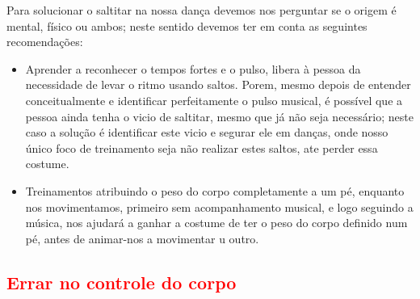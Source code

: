 \begin{SolutionT}
Para solucionar o saltitar na nossa dança devemos nos perguntar se o origem é mental, físico ou ambos;
neste sentido devemos ter em conta as seguintes recomendações:
\begin{itemize}
\item  Aprender a reconhecer o tempos fortes e o pulso, 
libera à pessoa da necessidade de levar o ritmo usando saltos.
Porem, mesmo depois de entender conceitualmente e identificar perfeitamente o pulso musical,
é possível que a pessoa ainda tenha o vicio de saltitar, mesmo que já não seja necessário;
neste caso a solução é identificar este vicio e segurar ele em danças, 
onde nosso único foco de treinamento seja não realizar estes saltos, ate perder essa costume.
\item  Treinamentos atribuindo o peso do corpo completamente a um pé, 
enquanto nos movimentamos, primeiro sem acompanhamento musical,
e logo seguindo a música, 
nos ajudará a ganhar a costume de ter o peso do corpo definido num pé,
antes de animar-nos a movimentar u outro. 
\end{itemize}
\end{SolutionT}




\subsection{\textcolor{red}{Errar no controle do corpo}}


